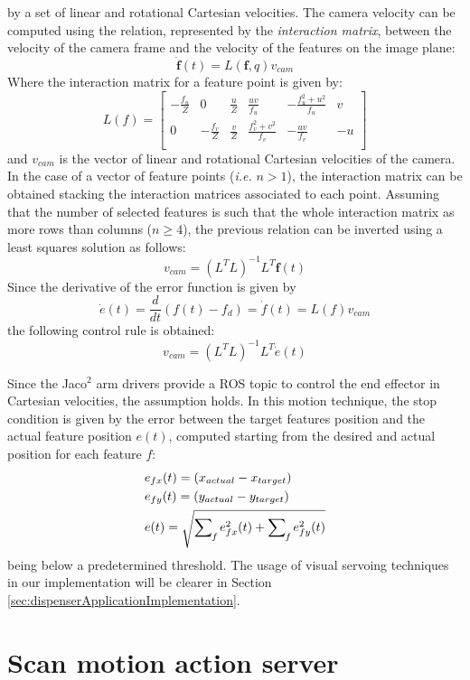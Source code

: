 by a set of linear and rotational Cartesian velocities.
The camera velocity can be computed using the relation, represented by the
\textit{interaction matrix}, between the velocity of the camera frame and the velocity of the features on the image plane:
\[
\dot{\boldsymbol{f}}(t) = L(\boldsymbol{f},q)v_{cam}
\]
Where the interaction matrix for a feature point is given by:
\[
L(f)=
\begin{bmatrix}
-\frac{f_u}{Z}	& 0 				& \frac{u}{Z}	& \frac{uv}{f_u} 		& -\frac{f_u^2+u^2}{f_u} & v \\
0			& -\frac{f_v}{Z}	& \frac{v}{Z}	& \frac{f_v^2+v^2}{f_v} &  -\frac{uv}{f_v} & -u\\
\end{bmatrix}
\]
and $v_{cam}$ is the vector of linear and rotational Cartesian velocities of the camera. In the case of a vector of feature points (\textit{i.e.} $n>1$), the interaction matrix can be obtained stacking the interaction matrices associated to each point.
Assuming that the number of selected features is such that the whole interaction matrix as
more rows than columns ($n\geq4$), the previous relation can be inverted using a least squares solution as follows:
\begin{equation}
	v_{cam}=(L^TL)^{-1}L^T\dot{\boldsymbol{f}}(t)
\end{equation}
Since the derivative of the error function is given by 
\[
	\dot{e}(t)=\frac{d}{dt}(f(t)-f_d) = \dot{f}(t) = L(f)v_{cam}
\]
the following control rule is obtained:
\[
v_{cam}=(L^TL)^{-1}L^T\dot{e}(t)
\]

Since the Jaco$^2$ arm drivers provide a \ac{ROS} topic to control the end effector in Cartesian velocities, the assumption holds. In this motion technique, the stop condition is given by the error between the target features position and the actual feature position $e(t)$, computed starting from the desired and actual position for each feature $f$:
\begin{align*}
	& e_{fx}(t)=(x_{actual} - x_{target}) \\
	& e_{fy}(t)=(y_{actual} - y_{target}) \\
	& e(t)=\sqrt{\sum_{}^{}\mathop{}_{\mkern-5mu f} e_{fx}^2(t) + \sum_{}^{}\mathop{}_{\mkern-5mu f} e_{fy}^2(t)}
\end{align*}
being below a predetermined threshold.
The usage of visual servoing techniques in our implementation will be clearer in Section \ref{sec:dispenserApplicationImplementation}.

\section{Scan motion action server}\label{sec:scanMotionActionServer}

